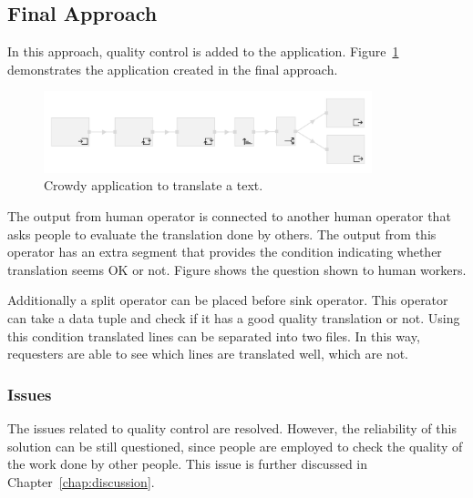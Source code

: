 \subsection{Final Approach}
In this approach, quality control is added to the application. Figure~\ref{fig:scenario2.2} demonstrates the application created in the final approach.

\begin{figure}[ht]
	\centering
	\includegraphics[width=0.85\textwidth]{figures/scenarios/scenario2_2.png}
	\caption{Crowdy application to translate a text.}
	\label{fig:scenario2.2}
\end{figure}

The output from human operator is connected to another human operator that asks people to evaluate the translation done by others. The output from this operator has an extra segment that provides the condition indicating whether translation seems OK or not. Figure shows the question shown to human workers.

Additionally a split operator can be placed before sink operator. This operator can take a data tuple and check if it has a good quality translation or not. Using this condition translated lines can be separated into two files. In this way, requesters are able to see which lines are translated well, which are not.

\subsubsection{Issues}
The issues related to quality control are resolved. However, the reliability of this solution can be still questioned, since people are employed to check the quality of the work done by other people. This issue is further discussed in Chapter~\ref{chap:discussion}.